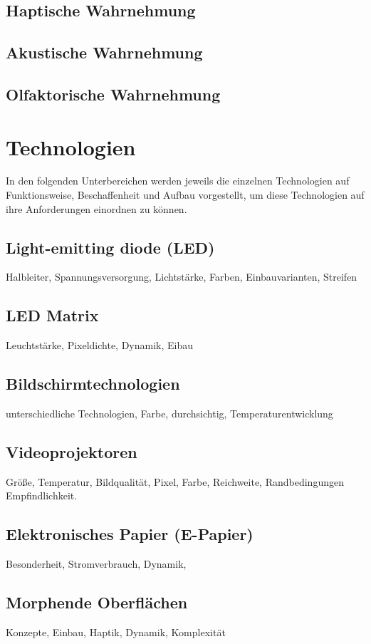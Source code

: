 \subsection{Haptische Wahrnehmung}
\subsection{Akustische Wahrnehmung}
\subsection{Olfaktorische Wahrnehmung}

\section{Technologien}
In den folgenden Unterbereichen werden jeweils die einzelnen Technologien auf Funktionsweise, Beschaffenheit und Aufbau vorgestellt, um diese Technologien auf ihre Anforderungen einordnen zu können.
\subsection{Light-emitting diode (LED)}
Halbleiter, Spannungsversorgung, Lichtstärke, Farben, Einbauvarianten, Streifen
\subsection{LED Matrix}
Leuchtstärke, Pixeldichte, Dynamik, Eibau
\subsection{Bildschirmtechnologien}
unterschiedliche Technologien, Farbe, durchsichtig, Temperaturentwicklung
\subsection{Videoprojektoren}
Größe, Temperatur, Bildqualität, Pixel, Farbe, Reichweite, Randbedingungen Empfindlichkeit.
\subsection{Elektronisches Papier (E-Papier)}
Besonderheit, Stromverbrauch, Dynamik,
\subsection{Morphende Oberflächen}
Konzepte, Einbau, Haptik, Dynamik, Komplexität

